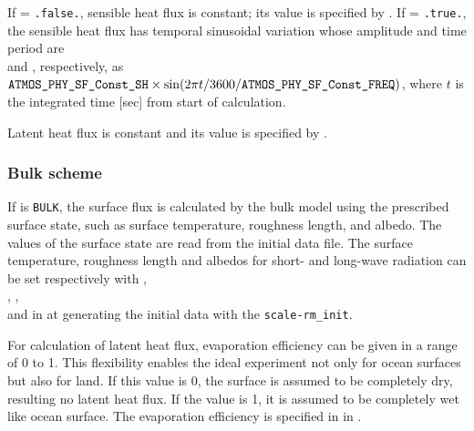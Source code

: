 If  = \verb|.false.|, sensible heat flux is constant;
its value is specified by .
If  = \verb|.true.|, the sensible heat flux has temporal sinusoidal variation whose amplitude and time period are \\  and , respectively, as \\
$\nmitemeq{ATMOS_PHY_SF_Const_SH} \times \sin(2\pi t/3600/\nmitemeq{ATMOS_PHY_SF_Const_FREQ})$,
where $t$ is the integrated time [sec] from start of calculation.

Latent heat flux is constant and its value is specified by .



\subsubsection{Bulk scheme}
If  is \verb|BULK|, the surface flux is calculated by the bulk model using the prescribed surface state, such as surface temperature, roughness length, and albedo.
The values of the surface state are read from the initial data file.
The surface temperature, roughness length and albedos for short- and long-wave radiation can be set respectively with , \\ , , \\ and  in  at generating the initial data with the \verb|scale-rm_init|.

For calculation of latent heat flux, evaporation efficiency can be given in a range of 0 to 1.
This flexibility enables the ideal experiment not only for ocean surfaces but also for land.
If this value is 0, the surface is assumed to be completely dry, resulting no latent heat flux.
If the value is 1, it is assumed to be completely wet like ocean surface.
The evaporation efficiency is specified in  in .



